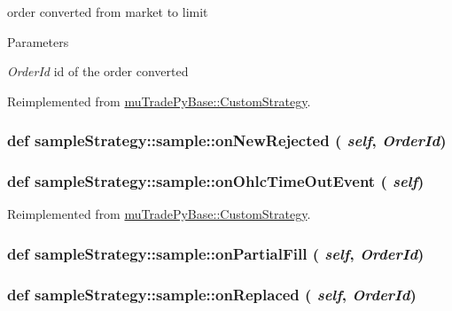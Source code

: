 order converted from market to limit 
\begin{DoxyParams}{Parameters}
\item[{\em OrderId}]id of the order converted \end{DoxyParams}


Reimplemented from \hyperlink{classmuTradePyBase_1_1CustomStrategy_ab15e441859c93390410973beb565872a}{muTradePyBase::CustomStrategy}.\hypertarget{classsampleStrategy_1_1sample_acb840933b56f5e6f81c04ea71d18d189}{
\subsubsection[{onNewRejected}]{\setlength{\rightskip}{0pt plus 5cm}def sampleStrategy::sample::onNewRejected ( {\em self}, \/   {\em OrderId})}}
\label{classsampleStrategy_1_1sample_acb840933b56f5e6f81c04ea71d18d189}
\hypertarget{classsampleStrategy_1_1sample_ab8d041be41bfa4e69b0a4953fc81458b}{
\subsubsection[{onOhlcTimeOutEvent}]{\setlength{\rightskip}{0pt plus 5cm}def sampleStrategy::sample::onOhlcTimeOutEvent ( {\em self})}}
\label{classsampleStrategy_1_1sample_ab8d041be41bfa4e69b0a4953fc81458b}
\begin{DoxyVerb}
\end{DoxyVerb}
 

Reimplemented from \hyperlink{classmuTradePyBase_1_1CustomStrategy_aa94a2228807baeaab027108dc663675e}{muTradePyBase::CustomStrategy}.\hypertarget{classsampleStrategy_1_1sample_a222fca1c338ee3514e9e74d640721898}{
\subsubsection[{onPartialFill}]{\setlength{\rightskip}{0pt plus 5cm}def sampleStrategy::sample::onPartialFill ( {\em self}, \/   {\em OrderId})}}
\label{classsampleStrategy_1_1sample_a222fca1c338ee3514e9e74d640721898}
\hypertarget{classsampleStrategy_1_1sample_a796c72e272e1fa82e689b587cf7f7ab5}{
\subsubsection[{onReplaced}]{\setlength{\rightskip}{0pt plus 5cm}def sampleStrategy::sample::onReplaced ( {\em self}, \/   {\em OrderId})}}
\label{classsampleStrategy_1_1sample_a796c72e272e1fa82e689b587cf7f7ab5}


